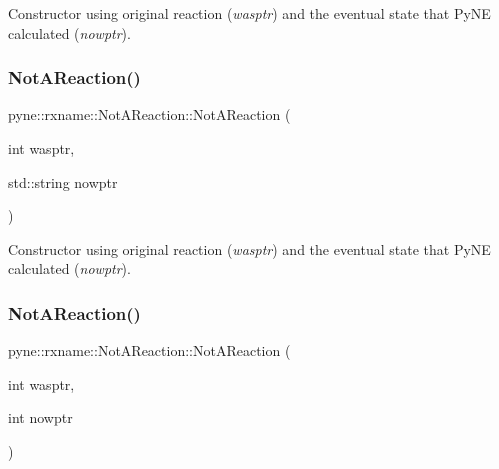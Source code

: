 Constructor using original reaction ({\itshape wasptr}) and the eventual state that Py\+NE calculated ({\itshape nowptr}). \mbox{\label{classpyne_1_1rxname_1_1_not_a_reaction_a828c48bf08dd96121ec83c6cced3063b}} 
\subsubsection{\texorpdfstring{Not\+A\+Reaction()}{NotAReaction()}\hspace{0.1cm}{\footnotesize\ttfamily [3/7]}}
{\footnotesize\ttfamily pyne\+::rxname\+::\+Not\+A\+Reaction\+::\+Not\+A\+Reaction (\begin{DoxyParamCaption}\item[{int}]{wasptr,  }\item[{std\+::string}]{nowptr }\end{DoxyParamCaption})\hspace{0.3cm}{\ttfamily [inline]}}

Constructor using original reaction ({\itshape wasptr}) and the eventual state that Py\+NE calculated ({\itshape nowptr}). \mbox{\label{classpyne_1_1rxname_1_1_not_a_reaction_a8d16f260eab4fbbc7a5a14b48ce5580d}} 
\subsubsection{\texorpdfstring{Not\+A\+Reaction()}{NotAReaction()}\hspace{0.1cm}{\footnotesize\ttfamily [4/7]}}
{\footnotesize\ttfamily pyne\+::rxname\+::\+Not\+A\+Reaction\+::\+Not\+A\+Reaction (\begin{DoxyParamCaption}\item[{int}]{wasptr,  }\item[{int}]{nowptr }\end{DoxyParamCaption})\hspace{0.3cm}{\ttfamily [inline]}}

